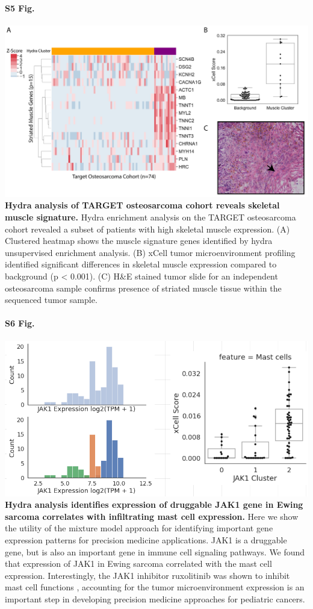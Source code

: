 \documentclass[10pt,letterpaper]{article}
\begin{document}
\paragraph*{S5 Fig.}
\includegraphics[width=\textwidth]{img/muscle-signature-genes-2x}
\label{S5_Fig} {\bf Hydra analysis of TARGET osteosarcoma cohort reveals skeletal muscle signature.} Hydra enrichment analysis on the TARGET osteosarcoma cohort revealed a subset of patients with high skeletal muscle expression. (A) Clustered heatmap shows the muscle signature genes identified by hydra unsupervised enrichment analysis. (B) xCell tumor microenvironment profiling identified significant differences in skeletal muscle expression compared to background (p < 0.001). (C) H\&E stained tumor slide for an independent osteosarcoma sample confirms presence of striated muscle tissue within the sequenced tumor sample.

\paragraph*{S6 Fig.}
\includegraphics[width=\textwidth]{img/Selection_026}
\label{S6_Fig} {\bf Hydra analysis identifies expression of druggable JAK1 gene in Ewing sarcoma correlates with infiltrating mast cell expression.} Here we show the utility of the mixture model approach for identifying important gene expression patterns for precision medicine applications. JAK1 is a druggable gene, but is also an important gene in immune cell signaling pathways. We found that expression of JAK1 in Ewing sarcoma correlated with the mast cell expression. Interestingly, the JAK1 inhibitor ruxolitinib was shown to inhibit mast cell functions \cite{hermansJAK1JAK2Inhibitor2018}, accounting for the tumor microenvironment expression is an important step in developing precision medicine approaches for pediatric cancers.
\end{document}
